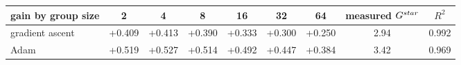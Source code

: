 \begin{tabular}{lcccccccc}
\toprule
gain by group size & 2 & 4 & 8 & 16 & 32 & 64 & measured $G^{\\star}$ & $R^2$ \\
\midrule
gradient ascent & +0.409 & +0.413 & +0.390 & +0.333 & +0.300 & +0.250 & 2.94 & 0.992 \\
Adam & +0.519 & +0.527 & +0.514 & +0.492 & +0.447 & +0.384 & 3.42 & 0.969 \\
\bottomrule
\end{tabular}